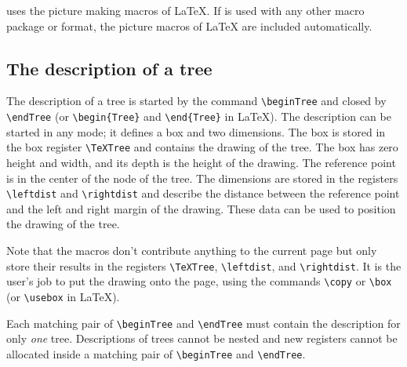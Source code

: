 \TreeTeX{} uses the picture making macros of \LaTeX. If \TreeTeX{} is used with 
any other macro package or format, the picture macros of                        
\LaTeX{} are included automatically.                                            
                                                                                
\subsection{The description of a tree}                                          
                                                                                
The description of a tree is started by the command \verb.\beginTree.           
and closed by \verb.\endTree. (or \verb.\begin{Tree}. and                       
\verb.\end{Tree}. in \LaTeX). The description can be                  
started in any mode; it defines a box and two dimensions. The                   
box is stored in the box register \verb.\TeXTree. and contains the              
drawing of the tree. The box has zero height and width, and its depth           
is the height of the drawing. The reference point is in the                     
center of the node of the tree. The dimensions are stored in the                
registers \verb.\leftdist. and \verb.\rightdist. and describe                   
the distance between the reference point and the left and                       
right margin of the drawing. These data can be used to position the             
drawing of the tree.                                                            
                                                                                
Note that the \TreeTeX{} macros don't contribute anything to the current        
page but only store their results in the registers                              
\verb.\TeXTree., \verb.\leftdist., and \verb.\rightdist.. It is the             
user's job to put the drawing onto the page, using the                          
commands \verb.\copy. or \verb.\box. (or \verb.\usebox. in \LaTeX).             
                                                                                
Each matching pair of \verb.\beginTree. and \verb.\endTree. must                
contain the description for only \emph{one} tree.                               
Descriptions of trees cannot be nested and                                      
new registers cannot be allocated inside                                        
a matching pair of \verb.\beginTree. and \verb.\endTree..                       
                                                                                
